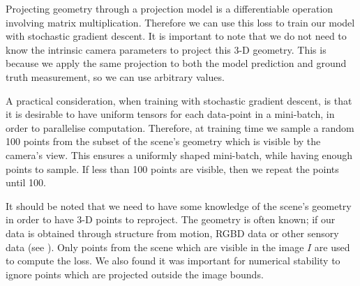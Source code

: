 Projecting geometry through a projection model is a differentiable operation involving matrix multiplication. Therefore we can use this loss to train our model with stochastic gradient descent. It is important to note that we do not need to know the intrinsic camera parameters to project this 3-D geometry. This is because we apply the same projection to both the model prediction and ground truth measurement, so we can use arbitrary values.

A practical consideration, when training with stochastic gradient descent, is that it is desirable to have uniform tensors for each data-point in a mini-batch, in order to parallelise computation. Therefore, at training time we sample a random 100 points from the subset of the scene's geometry which is visible by the camera's view. This ensures a uniformly shaped mini-batch, while having enough points to sample. If less than 100 points are visible, then we repeat the points until 100.

It should be noted that we need to have some knowledge of the scene's geometry in order to have 3-D points to reproject. The geometry is often known; if our data is obtained through structure from motion, RGBD data or other sensory data (see ). Only points from the scene which are visible in the image $I$ are used to compute the loss. We also found it was important for numerical stability to ignore points which are projected outside the image bounds.

